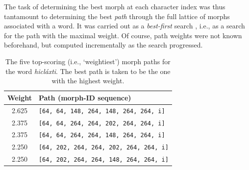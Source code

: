 {The task of determining the best morph at each character index was thus tantamount to determining the 
best \emph{path} through the full lattice of morphs associated with a word.
It was carried out as a
\emph{best-first} search \citep{pearl:1984}, i.e., as a search for the 
path with the maximal weight. Of course, path weights were not known beforehand, 
but computed incrementally as the search progressed. 

\begin{table}[tb]
\centering
\setlength{\extrarowheight}{8pt}
\begin{tabular}{cl}
\toprule
Weight & Path \small(morph-ID sequence) \\
\midrule
2.625 & \texttt{[64, 64, 148, 264, 148, 264, 264, i]}  \\
2.375  & \texttt{[64, 64, 264, 264, 202, 264, 264, i]} \\
2.375 & \texttt{[64, 64, 264, 264, 148, 264, 264, i]}  \\
2.250 & \texttt{[64, 202, 264, 264, 202, 264, 264, i]}  \\
2.250 & \texttt{[64, 202, 264, 264, 148, 264, 264, i]}  \\
\bottomrule
\end{tabular}
\caption{The five top-scoring (i.e., `weightiest') morph paths for the word \textit{hicl\'{a}xti}. The best path is taken to be the one with the highest weight.} %
\label{tab:weights-paths}
\end{table}





}
